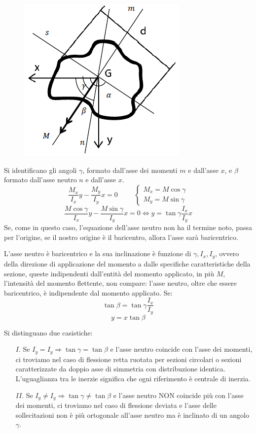 \begin{figure}[H]
	\centering
	\label{fig:screenshot002}
	\includegraphics[width=0.5\linewidth]{immagini_4/screenshot002}
\end{figure}
		
		Si identificano gli angoli $\gamma$, formato dall'asse dei momenti $m$ e dall'asse $x$, e $\beta$ formato dall'asse neutro $n$ e dall'asse $x$.
		\[\dfrac{M_x}{I_x}y - \dfrac{M_y}{I_y}x = 0 \hspace{1cm} \begin{cases}
			M_x = M\cos\gamma \\
			M_y = M\sin\gamma
		\end{cases}\]
		\[\dfrac{ M\cos\gamma}{I_x}y - \dfrac{M\sin\gamma}{I_y}x =0 \Leftrightarrow y = \tan\gamma \dfrac{I_x}{I_y}x\]
		Se, come in questo caso, l'equazione dell'asse neutro non ha il termine noto, passa per l'origine, se il nostro origine è il baricentro, allora l'asse sarà baricentrico.\newline 
		
		L'asse neutro è baricentrico e la sua inclinazione è funzione di $\gamma, I_x, I_y$, ovvero della direzione di applicazione del momento a dalle specifiche caratteristiche della sezione, queste indipendenti dall'entità del momento applicato, in più $M$, l'intensità del momento flettente, non compare: l'asse neutro, oltre che essere baricentrico, è indipendente dal momento applicato. \newline
		Se:
		\[ \tan\beta = \tan\gamma \dfrac{I_x}{I_y} \]
		\[ y = x\tan\beta \]
		
		Si distinguano due casistiche:
		\begin{itemize}
			\item[$ I. $] Se $I_y = I_y \Rightarrow \tan\gamma = \tan\beta $ e l'asse neutro coincide con l'asse dei momenti, ci troviamo nel caso di flessione retta ruotata per sezioni circolari o sezioni caratterizzate da doppio asse di simmetria con distribuzione identica. L’uguaglianza tra
			le inerzie significa che ogni
			riferimento è centrale di inerzia.
			
			\item[$ II. $] Se $I_y \neq I_y \Rightarrow \tan\gamma \neq \tan\beta $ e l'asse neutro NON coincide più con l'asse dei momenti, ci troviamo nel caso di flessione deviata e l'asse delle sollecitazioni non è più ortogonale all'asse neutro ma è inclinato di un angolo $\gamma$.
		\end{itemize}
		 
